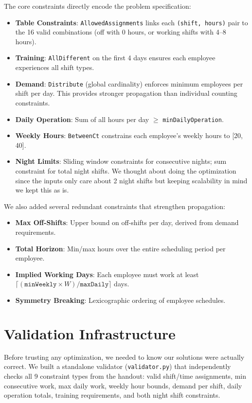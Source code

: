 \documentclass[11pt]{article}
\begin{document}
The core constraints directly encode the problem specification:
\begin{itemize}
	\item \textbf{Table Constraints}: \texttt{AllowedAssignments} links each \texttt{(shift, hours)} pair to the 16 valid combinations (off with 0 hours, or working shifts with 4--8 hours).
	\item \textbf{Training}: \texttt{AllDifferent} on the first 4 days ensures each employee experiences all shift types.
	\item \textbf{Demand}: \texttt{Distribute} (global cardinality) enforces minimum employees per shift per day. This provides stronger propagation than individual counting constraints.
	\item \textbf{Daily Operation}: Sum of all hours per day $\geq$ \texttt{minDailyOperation}.
	\item \textbf{Weekly Hours}: \texttt{BetweenCt} constrains each employee's weekly hours to [20, 40].
	\item \textbf{Night Limits}: Sliding window constraints for consecutive nights; sum constraint for total night shifts. We thought about doing the optimization since the inputs only care about 2 night shifts but keeping scalability in mind we kept this as is.
\end{itemize}

We also added several redundant constraints that strengthen propagation:
\begin{itemize}
	\item \textbf{Max Off-Shifts}: Upper bound on off-shifts per day, derived from demand requirements.
	\item \textbf{Total Horizon}: Min/max hours over the entire scheduling period per employee.
	\item \textbf{Implied Working Days}: Each employee must work at least $\lceil(\texttt{minWeekly} \times W) / \texttt{maxDaily}\rceil$ days.
	\item \textbf{Symmetry Breaking}: Lexicographic ordering of employee schedules.
\end{itemize}

\section*{Validation Infrastructure}

Before trusting any optimization, we needed to know our solutions were actually correct. We built a standalone validator (\texttt{validator.py}) that independently checks all 9 constraint types from the handout: valid shift/time assignments, min consecutive work, max daily work, weekly hour bounds, demand per shift, daily operation totals, training requirements, and both night shift constraints.
\end{document}
